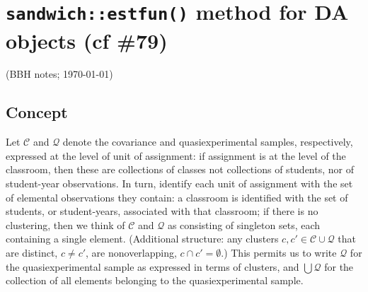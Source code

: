 \documentclass{article}
\author{BBH}
\begin{document}
\nobibliography*

\section{\texttt{sandwich::estfun()} method for DA objects (cf
  \#79)}
(BBH notes; \today)
\subsection{Concept}

Let $\mathcal{C}$ and $\mathcal{Q}$ denote the covariance and
quasiexperimental samples, respectively, expressed at the level of
unit of assignment: if assignment is at the level of the classroom,
then these are collections of classes not collections of students, nor
of student-year observations.  In turn, identify each unit of assignment
with the set of elemental observations they contain: a classroom is
identified with the 
set of students, or student-years, associated with that classroom;
if there is no clustering, then we think of $\mathcal{C}$ and
$\mathcal{Q}$ as consisting of singleton sets, each containing a
single element.  (Additional structure: any clusters $c, c' \in \mathcal{C}
\cup \mathcal{Q}$ that are distinct, $c  \neq c'$, are nonoverlapping, $c \cap c' = \emptyset$.) This permits us to write $\mathcal{Q}$ for the
quasiexperimental sample as expressed in terms of clusters, and $\bigcup
\mathcal{Q}$ for the collection of all elements belonging to the
quasiexperimental sample.
\end{document}
